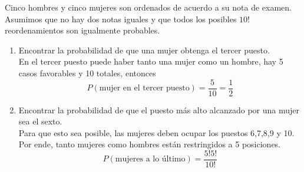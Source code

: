 \item Cinco hombres y cinco mujeres son ordenados de acuerdo a su nota de examen. Asumimos que no hay dos notas iguales y que todos los posibles $10!$ reordenamientos son igualmente probables.
    \begin{enumerate}
        \item Encontrar la probabilidad de que una mujer obtenga el tercer puesto.\e\\
            En el tercer puesto puede haber tanto una mujer como un hombre, hay 5 casos favorables y 10 totales, entonces\[P(\text{mujer en el tercer puesto})=\frac{5}{10}=\frac{1}{2}\]
        \item Encontrar la probabilidad de que el puesto más alto alcanzado por una mujer sea el sexto.\e\\
            Para que esto sea posible, las mujeres deben ocupar los puestos 6,7,8,9 y 10. Por ende, tanto mujeres como hombres están restringidos a 5 posiciones.\[P(\text{mujeres a lo último})=\frac{5!5!}{10!}\]
    \end{enumerate}